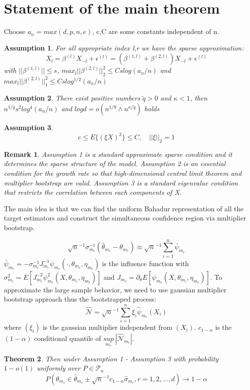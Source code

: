 \documentclass{article}
\newtheorem{theorem}{Theorem}[section]
\newtheorem{remark}[theorem]{Remark}
\newtheorem{assumption}{Assumption}
\begin{document}
\section{Statement of the main theorem}
Choose $a_n=max(d,p,n,e)$, c,C are some constants independent of n.
\begin{assumption}
  For all appropriate index l,r we have the sparse approximation:
  \begin{equation}
      X_l=\beta^{(l)}X_{-l}+\epsilon^{(l)}=(\beta^{(1,l)}+\beta^{(2,l)})X_{-l}+\epsilon^{(l)}
  \end{equation}
  with $||\beta^{(1,l)}||\leq s$, $max_l ||\beta^{(2,l)}||_2^2\leq Cslog(a_n/n)$ and $max_l ||\beta^{(2,l)}||_1^2\leq Cslog^{1/2}(a_n/n)$
\end{assumption}
\begin{assumption}
    There exist positive numbers $\tilde{q}>0$ and $\kappa<1$, then $n^{1/\tilde{q}}s^2log^4 (a_n/n)$ and $log d=o(n^{1/9}\wedge n^{\kappa/\tilde{q}})$ holds
\end{assumption}

\begin{assumption}
    \begin{equation}
      c \leq E\{ (\xi X)^2\}\leq C,\quad ||\xi||_2=1
    \end{equation}
\end{assumption}

\begin{remark}
    Assumption 1 is a standard approximate sparse condition and it determines the sparse structure of the model. Assumption 2 is an essential condition for the growth rate so that high-dimensional central limit theorem and multiplier bootstrap are valid. Assumption 3 is a standard eigenvalue condition that restricts the correlation between each components of X.
\end{remark}
The main idea is that we can find the uniform Bahadur representation of all the target estimators and construct the simultaneous confidence region via multiplier bootstrap. 

\[
\sqrt{n}^{-1}\sigma_{m_r}^{-1}(\hat{\theta}_{m_r}-\theta_{m_r}) \approx \sqrt{n}^{-1} \sum_{i=1}^{n} \bar{\psi}_{m_r}
\]
$\bar{\psi}_{m_r}=-\sigma_{m_r}^{-1}J^{-1}_{m_r}\psi_{m_r}(\cdot,\theta_{m_r},\eta_{m_r})$ is the influence function with $\sigma_{m_r}^2=E[J^{-2}_{m_r} \psi_{m_r}^2(X,\theta_{m_r},\eta_{m_r})]$ and $J_{m_r} = \partial_\theta E[\psi_{m_r}(X,\theta_{m_r},\eta_{m_r})]$. To approximate the large sample behavior, we need to use gaussian multiplier bootstrap approach thus the bootstrapped process:
\[
\hat{\mathcal{N}} = \sqrt{n}^{-1} \sum_{i=1}^{n} \xi_i \hat{\psi}_{m_r}(X_i)
\]
where $(\xi_i)$ is the gaussian multiplier independent from $(X_i)$. $c_{1-\alpha}$ is the $(1- \alpha)$ conditional quantile of $\underset{m_r}{sup}\: |\hat{\mathcal{N}}_{m_r}| $.
\begin{theorem}
   Then under Assumption 1 - Assumption 3 with probability $1-o(1)$ uniformly over $P\in \mathcal{P}_n$
\[
P(\theta_{m_r} \in \hat{\theta}_{m_r} \pm \sqrt{n}^{-1}c_{1-\alpha}\hat{\sigma}_{m_r},r=1,2,...,d) \longrightarrow 1-\alpha
\]
 
\end{theorem}
\end{document}
